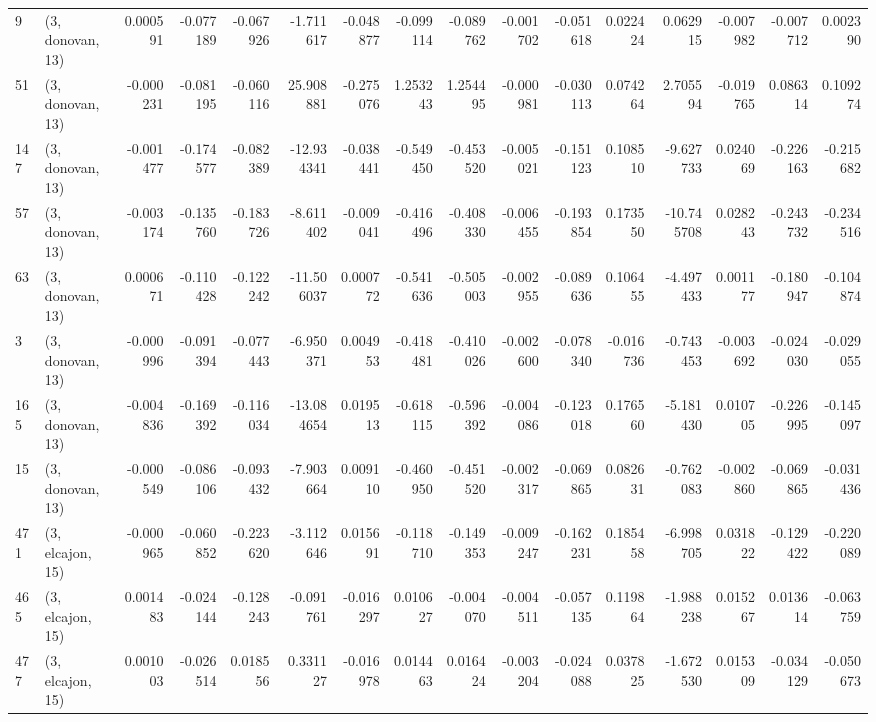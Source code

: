 \begin{tabular}{llrrrrrrrrrrrrrr}
9   &  (3, donovan, 13) &   0.000591 & -0.077189 & -0.067926 &   -1.711617 & -0.048877 &  -0.099114 & -0.089762 & -0.001702 & -0.051618 &  0.022424 &    0.062915 & -0.007982 & -0.007712 &  0.002390 \\
51  &  (3, donovan, 13) &  -0.000231 & -0.081195 & -0.060116 &   25.908881 & -0.275076 &   1.253243 &  1.254495 & -0.000981 & -0.030113 &  0.074264 &    2.705594 & -0.019765 &  0.086314 &  0.109274 \\
147 &  (3, donovan, 13) &  -0.001477 & -0.174577 & -0.082389 &  -12.934341 & -0.038441 &  -0.549450 & -0.453520 & -0.005021 & -0.151123 &  0.108510 &   -9.627733 &  0.024069 & -0.226163 & -0.215682 \\
57  &  (3, donovan, 13) &  -0.003174 & -0.135760 & -0.183726 &   -8.611402 & -0.009041 &  -0.416496 & -0.408330 & -0.006455 & -0.193854 &  0.173550 &  -10.745708 &  0.028243 & -0.243732 & -0.234516 \\
63  &  (3, donovan, 13) &   0.000671 & -0.110428 & -0.122242 &  -11.506037 &  0.000772 &  -0.541636 & -0.505003 & -0.002955 & -0.089636 &  0.106455 &   -4.497433 &  0.001177 & -0.180947 & -0.104874 \\
3   &  (3, donovan, 13) &  -0.000996 & -0.091394 & -0.077443 &   -6.950371 &  0.004953 &  -0.418481 & -0.410026 & -0.002600 & -0.078340 & -0.016736 &   -0.743453 & -0.003692 & -0.024030 & -0.029055 \\
165 &  (3, donovan, 13) &  -0.004836 & -0.169392 & -0.116034 &  -13.084654 &  0.019513 &  -0.618115 & -0.596392 & -0.004086 & -0.123018 &  0.176560 &   -5.181430 &  0.010705 & -0.226995 & -0.145097 \\
15  &  (3, donovan, 13) &  -0.000549 & -0.086106 & -0.093432 &   -7.903664 &  0.009110 &  -0.460950 & -0.451520 & -0.002317 & -0.069865 &  0.082631 &   -0.762083 & -0.002860 & -0.069865 & -0.031436 \\
471 &  (3, elcajon, 15) &  -0.000965 & -0.060852 & -0.223620 &   -3.112646 &  0.015691 &  -0.118710 & -0.149353 & -0.009247 & -0.162231 &  0.185458 &   -6.998705 &  0.031822 & -0.129422 & -0.220089 \\
465 &  (3, elcajon, 15) &   0.001483 & -0.024144 & -0.128243 &   -0.091761 & -0.016297 &   0.010627 & -0.004070 & -0.004511 & -0.057135 &  0.119864 &   -1.988238 &  0.015267 &  0.013614 & -0.063759 \\
477 &  (3, elcajon, 15) &   0.001003 & -0.026514 &  0.018556 &    0.331127 & -0.016978 &   0.014463 &  0.016424 & -0.003204 & -0.024088 &  0.037825 &   -1.672530 &  0.015309 & -0.034129 & -0.050673 \\

\end{tabular}
